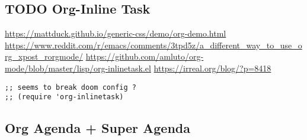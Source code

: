 \documentclass[8pt]{article}
\begin{document}
\subsection{{\bfseries\sffamily TODO} Org-Inline Task}
\label{sec:org2ab6920}
\url{https://mattduck.github.io/generic-css/demo/org-demo.html}
\url{https://www.reddit.com/r/emacs/comments/3tpd5z/a\_different\_way\_to\_use\_org\_xpost\_rorgmode/}
\url{https://github.com/amluto/org-mode/blob/master/lisp/org-inlinetask.el}
\url{https://irreal.org/blog/?p=8418}
\begin{verbatim}
;; seems to break doom config ?
;; (require 'org-inlinetask)
\end{verbatim}

\subsection{Org Agenda + Super Agenda}
\label{sec:org41ab738}
\end{document}
